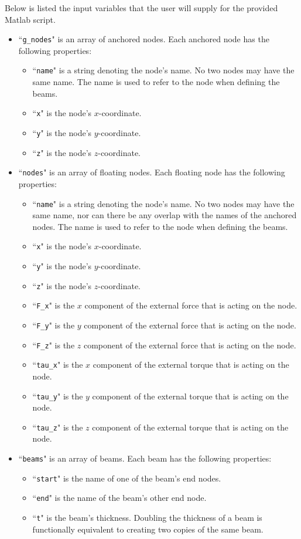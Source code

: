 \documentclass{article}
\begin{document}
Below is listed the input variables that the user will supply for the provided Matlab script.

\begin{itemize}
\item ``\texttt{g\_nodes}" is an array of anchored nodes. Each anchored node has the following properties:
	\begin{itemize}
	\item ``\texttt{name}" is a string denoting the node's name. No two nodes may have the same name. The name is used to refer to the node when defining the beams.
	\item ``\texttt{x}" is the node's \(x\)-coordinate.
	\item ``\texttt{y}" is the node's \(y\)-coordinate.
	\item ``\texttt{z}" is the node's \(z\)-coordinate.
	\end{itemize}
\item ``\texttt{nodes}" is an array of floating nodes. Each floating node has the following properties:
	\begin{itemize}
	\item ``\texttt{name}" is a string denoting the node's name. No two nodes may have the same name, nor can there be any overlap with the names of the anchored nodes. The name is used to refer to the node when defining the beams.
	\item ``\texttt{x}" is the node's \(x\)-coordinate.
	\item ``\texttt{y}" is the node's \(y\)-coordinate.
	\item ``\texttt{z}" is the node's \(z\)-coordinate.
	\item ``\texttt{F\_x}" is the \(x\) component of the external force that is acting on the node.
	\item ``\texttt{F\_y}" is the \(y\) component of the external force that is acting on the node.
	\item ``\texttt{F\_z}" is the \(z\) component of the external force that is acting on the node.
	\item ``\texttt{tau\_x}" is the \(x\) component of the external torque that is acting on the node.
	\item ``\texttt{tau\_y}" is the \(y\) component of the external torque that is acting on the node.
	\item ``\texttt{tau\_z}" is the \(z\) component of the external torque that is acting on the node.
	\end{itemize}
\item ``\texttt{beams}" is an array of beams. Each beam has the following properties:
	\begin{itemize}
	\item ``\texttt{start}" is the name of one of the beam's end nodes.
	\item ``\texttt{end}" is the name of the beam's other end node.
	\item ``\texttt{t}" is the beam's thickness. Doubling the thickness of a beam is functionally equivalent to creating two copies of the same beam.
	\end{itemize}
\end{itemize}
\end{document}
